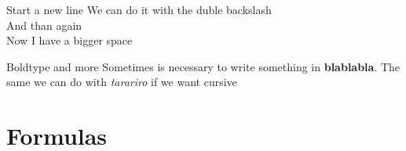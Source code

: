 \documentclass{beamer} %
\begin{document}
\begin{frame}{Start a new line}
We can do it with the duble backslash \\
And than again \\
\bigskip 
Now I have a bigger space
\end{frame}

\begin{frame}{Boldtype and more}
Sometimes is necessary to write something in \textbf{blablabla}. The same we can do with \textit{tarariro} if we want cursive
\end{frame}

\section{Formulas}
\end{document}
